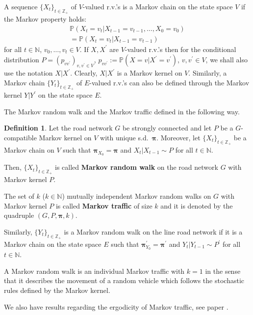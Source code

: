 \documentclass[b5paper,12pt]{report}
\theoremstyle{definition}
\newtheorem{definition}{Definition}
\newcommand{\bpi}{\boldsymbol{\pi}}
\newcommand{\PP}{\mathbb{P}}
\begin{document}
A sequence $\{X_t\}_{t\in\mathbb{Z}_+}$ of $V$-valued r.v.'s is a Markov chain on the state space $V$ if the Markov property holds:
\begin{equation*}
\begin{aligned}
         \PP(X_t=v_t | X_{t-1}=v_{t-1},\ldots, X_0=v_0) \\ =  \PP(X_t=v_t | X_{t-1}=v_{t-1})
\end{aligned}
\end{equation*} 
for all $t\in\mathbb{N}$, $v_0,\ldots,v_t\in V$. If $X,X^\prime$ are $V$-valued r.v.'s then for the conditional distribution $P=(p_{v v^\prime})_{v,v^\prime\in V}$, $p_{v v^\prime}:=\PP(X=v | X^\prime=v^\prime)$, $v,v^\prime\in V$, we shall also use the notation $X|X^\prime$. Clearly, $X|X^\prime$ is a Markov kernel on $V$. Similarly, a Markov chain $\{Y_t\}_{t\in\mathbb{Z}_+}$ of $E$-valued r.v.'s can also be defined through the Markov kernel $Y|Y^\prime$ on the state space $E$.

The Markov random walk and the Markov traffic defined in the following way.

\begin{definition}
Let the road network $G$ be strongly connected and let $P$ be a $G$-compatible Markov kernel on $V$ with unique s.d.~$\bpi$. Moreover, let $\{X_t\}_{t\in\mathbb{Z}_+}$ be a Markov chain on $V$ such that $\bpi_{X_0}=\bpi$ and $X_t|X_{t-1} \sim P$ for all $t\in\mathbb{N}$. 

Then, $\{X_t\}_{t\in\mathbb{Z}_+}$ is called \textbf{Markov random walk} on the road network $G$ with Markov kernel $P$.

The set of $k$ ($k\in\mathbb{N}$) mutually independent Markov random walks on $G$ with Markov kernel $P$ is called \textbf{Markov traffic} of size $k$ and it is denoted by the quadruple $(G,P,\bpi,k)$.
\end{definition}

Similarly, $\{Y_t\}_{t\in\mathbb{Z}_+}$ is a Markov random walk on the line road network if it is a Markov chain on the state space $E$ such that $\bpi^\prime_{Y_0}= \bpi^\prime$ and $Y_t|Y_{t-1}\sim P^\prime$  for all $t\in\mathbb{N}$.

A Markov random walk is an individual Markov traffic with $k=1$ in the sense that it describes the movement of a random vehicle which follows the stochastic rules defined by the Markov kernel. 

We also have results regarding the ergodicity of Markov traffic, see paper \cite{traffic-paper}.
\end{document}
